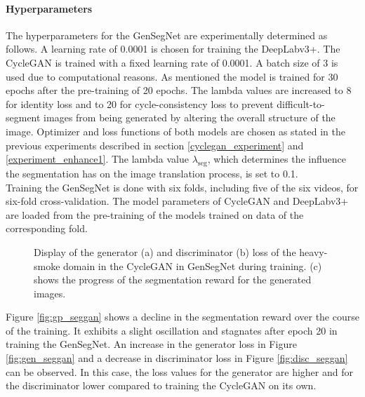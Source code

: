 \paragraph{Hyperparameters} The hyperparameters for the GenSegNet are experimentally determined as follows.
A learning rate of 0.0001 is chosen for training the DeepLabv3+.
The CycleGAN is trained with a fixed learning rate of 0.0001.
A batch size of 3 is used due to computational reasons.
As mentioned the model is trained for 30 epochs after the pre-training of 20 epochs.
The lambda values are increased to 8 for identity loss and to 20 for cycle-consistency loss to prevent difficult-to-segment images from being generated by altering the overall structure of the image.
Optimizer and loss functions of both models are chosen as stated in the previous experiments described in section \ref{cyclegan_experiment} and \ref{experiment_enhance1}. %
The lambda value $\lambda_{\text{seg}}$, which determines the influence the segmentation has on the image translation process, is set to 0.1.\\
Training the GenSegNet is done with six folds, including five of the six videos, for six-fold cross-validation.
The model parameters of CycleGAN and DeepLabv3+ are loaded from the pre-training of the models trained on data of the corresponding fold.\\
\begin{figure}[bt]
    \centering
    \hfill
    \hfill
    \caption[GenSegNet loss curves]{Display of the generator (a) and discriminator (b) loss of the heavy-smoke domain in the CycleGAN in GenSegNet during training.
    (c) shows the progress of the segmentation reward for the generated images.}\label{fig:gen_disc_genseg}
\end{figure}
Figure \ref{fig:gp_seggan} shows a decline in the segmentation reward over the course of the training.
It exhibits a slight oscillation and stagnates after epoch 20 in training the GenSegNet.
An increase in the generator loss in Figure \ref{fig:gen_seggan} and a decrease in discriminator loss in Figure \ref{fig:disc_seggan} can be observed.
In this case, the loss values for the generator are higher and for the discriminator lower compared to training the CycleGAN on its own.
